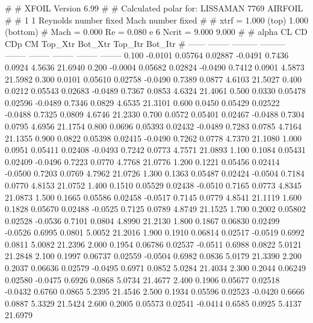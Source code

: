 #  
#       XFOIL         Version 6.99
#  
# Calculated polar for: LISSAMAN 7769 AIRFOIL                           
#  
# 1 1 Reynolds number fixed          Mach number fixed         
#  
# xtrf =   1.000 (top)        1.000 (bottom)  
# Mach =   0.000     Re =     0.080 e 6     Ncrit =   9.000  9.000
#  
#   alpha    CL        CD       CDp       CM     Top_Xtr  Bot_Xtr  Top_Itr  Bot_Itr
#  ------ -------- --------- --------- -------- -------- -------- -------- --------
   0.100  -0.0101   0.05764   0.02887  -0.0491   0.7436   0.0924   4.5636  21.6940
   0.200  -0.0004   0.05682   0.02824  -0.0490   0.7412   0.0901   4.5873  21.5982
   0.300   0.0101   0.05610   0.02758  -0.0490   0.7389   0.0877   4.6103  21.5027
   0.400   0.0212   0.05543   0.02683  -0.0489   0.7367   0.0853   4.6324  21.4061
   0.500   0.0330   0.05478   0.02596  -0.0489   0.7346   0.0829   4.6535  21.3101
   0.600   0.0450   0.05429   0.02522  -0.0488   0.7325   0.0809   4.6746  21.2330
   0.700   0.0572   0.05401   0.02467  -0.0488   0.7304   0.0795   4.6956  21.1754
   0.800   0.0696   0.05393   0.02432  -0.0489   0.7283   0.0785   4.7164  21.1355
   0.900   0.0822   0.05398   0.02415  -0.0490   0.7262   0.0778   4.7370  21.1080
   1.000   0.0951   0.05411   0.02408  -0.0493   0.7242   0.0773   4.7571  21.0893
   1.100   0.1084   0.05431   0.02409  -0.0496   0.7223   0.0770   4.7768  21.0776
   1.200   0.1221   0.05456   0.02414  -0.0500   0.7203   0.0769   4.7962  21.0726
   1.300   0.1363   0.05487   0.02424  -0.0504   0.7184   0.0770   4.8153  21.0752
   1.400   0.1510   0.05529   0.02438  -0.0510   0.7165   0.0773   4.8345  21.0873
   1.500   0.1665   0.05586   0.02458  -0.0517   0.7145   0.0779   4.8541  21.1119
   1.600   0.1828   0.05670   0.02488  -0.0525   0.7125   0.0789   4.8749  21.1525
   1.700   0.2002   0.05802   0.02528  -0.0536   0.7101   0.0804   4.8990  21.2130
   1.800   0.1867   0.06830   0.02499  -0.0526   0.6995   0.0801   5.0052  21.2016
   1.900   0.1910   0.06814   0.02517  -0.0519   0.6992   0.0811   5.0082  21.2396
   2.000   0.1954   0.06786   0.02537  -0.0511   0.6988   0.0822   5.0121  21.2848
   2.100   0.1997   0.06737   0.02559  -0.0504   0.6982   0.0836   5.0179  21.3390
   2.200   0.2037   0.06636   0.02579  -0.0495   0.6971   0.0852   5.0284  21.4034
   2.300   0.2044   0.06249   0.02580  -0.0475   0.6926   0.0868   5.0734  21.4677
   2.400   0.1906   0.05677   0.02518  -0.0432   0.6760   0.0865   5.2395  21.4546
   2.500   0.1934   0.05596   0.02523  -0.0420   0.6666   0.0887   5.3329  21.5424
   2.600   0.2005   0.05573   0.02541  -0.0414   0.6585   0.0925   5.4137  21.6979
